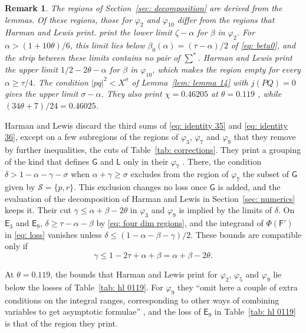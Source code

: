 \documentclass{article}
\numberwithin{equation}{section}
\newtheorem{remark}[lemma]{Remark}
\newcommand{\Le}{\leqslant}
\newcommand{\Ge}{\geqslant}
\begin{document}
\begin{remark}
\label{rem: misprints}
The regions of Section~\ref{sec: decomposition} are derived from the lemmas. Of these regions, those for $\varphi_2$ and $\varphi_{10}$ differ from the regions that Harman and Lewis print. \citet[p.~132]{harman2001gaussian} print the lower limit $\zeta - \alpha$ for $\beta$ in $\varphi_2$. For $\alpha > (1 + 10\theta)/6$, this limit lies below $\beta_0(\alpha) = (\tau - \alpha)/2$ of \eqref{eq: beta0}, and the strip between these limits contains no pair of $\sum^*$. Harman and Lewis print the upper limit $1/2 - 2\theta - \alpha$ for $\beta$ in $\varphi_{10}$, which makes the region empty for every $\alpha \Ge \tau/4$. The condition $|pq|^2 < X^{\sigma}$ of Lemma~\ref{lem: lemma 14} with $j(PQ) = 0$ gives the upper limit $\sigma - \alpha$. They also print $\chi = 0.46205$ at $\theta = 0.119$ \citep[p.~120]{harman2001gaussian}, while $(34\theta + 7)/24 = 0.46025$.
\end{remark}

Harman and Lewis discard the third sums of \eqref{eq: identity 35} and \eqref{eq: identity 36}, except on a few subregions of the regions of $\varphi_3$, $\varphi_7$ and $\varphi_9$ that they remove by further inequalities, the cuts of Table~\ref{tab: corrections}. They print a grouping of the kind that defines $\mathsf{G}$ and $\mathsf{L}$ only in their $\varphi_7$ \citep[p.~133]{harman2001gaussian}. There, the condition $\delta > 1 - \alpha - \gamma - \sigma$ when $\alpha + \gamma \Ge \sigma$ excludes from the region of $\varphi_7$ the subset of $\mathsf{G}$ given by $\mathcal{S} = \{p, r\}$. This exclusion changes no loss once $\mathsf{G}$ is added, and the evaluation of the decomposition of Harman and Lewis in Section~\ref{sec: numerics} keeps it. Their cut $\gamma \Le \alpha + \beta - 2\theta$ in $\varphi_3$ and $\varphi_9$ is implied by the limits of $\delta$. On $\mathsf{E}_3$ and $\mathsf{E}_9$, $\delta \Ge \tau - \alpha - \beta$ by \eqref{eq: four dim regions}, and the integrand of $\Phi(\mathsf{F}')$ in \eqref{eq: loss} vanishes unless $\delta \Le (1 - \alpha - \beta - \gamma)/2$. These bounds are compatible only if
\begin{equation*}
\gamma \Le 1 - 2\tau + \alpha + \beta = \alpha + \beta - 2\theta.
\end{equation*}

At $\theta = 0.119$, the bounds that Harman and Lewis print for $\varphi_2$, $\varphi_5$ and $\varphi_9$ lie below the losses of Table~\ref{tab: hl 0119}. For $\varphi_9$ they ``omit here a couple of extra conditions on the integral ranges, corresponding to other ways of combining variables to get asymptotic formulae'' \citep[p.~133]{harman2001gaussian}, and the loss of $\mathsf{E}_9$ in Table~\ref{tab: hl 0119} is that of the region they print.
\end{document}
